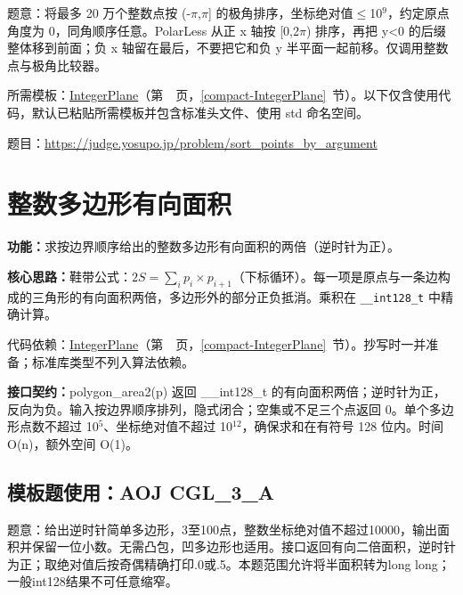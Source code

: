 \label{usage-example-126}

题意：将最多 20 万个整数点按 (-$\pi$,$\pi$] 的极角排序，坐标绝对值$\le$10$^{9}$，约定原点角度为 0，同角顺序任意。PolarLess 从正 x 轴按 [0,2$\pi$) 排序，再把 y<0 的后缀整体移到前面；负 x 轴留在最后，不要把它和负 y 半平面一起前移。仅调用整数点与极角比较器。

所需模板：\hyperref[compact-IntegerPlane]{IntegerPlane}（第~\pageref{compact-IntegerPlane}~页，\ref{compact-IntegerPlane}~节）。以下仅含使用代码，默认已粘贴所需模板并包含标准头文件、使用 std 命名空间。

题目：\url{https://judge.yosupo.jp/problem/sort_points_by_argument}



\Needspace{264pt}

\section{整数多边形有向面积}\label{compact-polygon_area2}

\noindent\textbf{功能：}\allowbreak 求按边界顺序给出的整数多边形有向面积的两倍（逆时针为正）。

\textbf{核心思路：}\allowbreak 鞋带公式：$2S=\sum_i p_i\times p_{i+1}$（下标循环）。每一项是原点与一条边构成的三角形的有向面积两倍，多边形外的部分正负抵消。乘积在 \texttt{\_\_int128\_t} 中精确计算。

代码依赖：\hyperref[compact-IntegerPlane]{IntegerPlane}（第~\pageref{compact-IntegerPlane}~页，\ref{compact-IntegerPlane}~节）。抄写时一并准备；标准库类型不列入算法依赖。

{\sloppy{}\noindent\textbf{接口契约：}polygon\_area2(p) 返回 \_\_int128\_t 的有向面积两倍；逆时针为正，反向为负。输入按边界顺序排列，隐式闭合；空集或不足三个点返回 0。单个多边形点数不超过 10$^{5}$、坐标绝对值不超过 10$^{12}$，确保求和在有符号 128 位内。时间 O(n)，额外空间 O(1)。\par}



\Needspace{316pt}

\subsection*{模板题使用：AOJ CGL\_3\_A}

\label{usage-example-184}

题意：给出逆时针简单多边形，3至100点，整数坐标绝对值不超过10000，输出面积并保留一位小数。无需凸包，凹多边形也适用。接口返回有向二倍面积，逆时针为正；取绝对值后按奇偶精确打印.0或.5。本题范围允许将半面积转为long long；一般int128结果不可任意缩窄。

